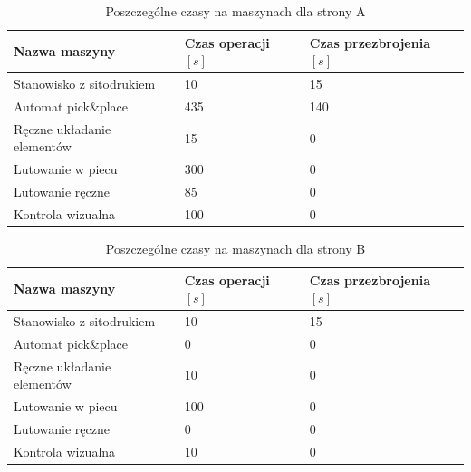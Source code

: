 \begin{table}[H]
	\centering
	\caption{Poszczególne czasy na maszynach dla strony A}
	\begin{tabular}{lll}
		\toprule
		Nazwa maszyny                 & Czas operacji $[s]$ & Czas przezbrojenia $[s]$ \\
		\midrule
		Stanowisko z sitodrukiem      & 10                  & 15                       \\
		Automat pick\&place           & 435                 & 140                      \\
		Ręczne układanie elementów & 15                  & 0                        \\
		Lutowanie w piecu             & 300                 & 0                        \\
		Lutowanie ręczne             & 85                  & 0                        \\
		Kontrola wizualna             & 100                 & 0                        \\
		\bottomrule
	\end{tabular}
\end{table}

\begin{table}[H]
	\centering
	\caption{Poszczególne czasy na maszynach dla strony B}
	\begin{tabular}{lll}
		\toprule
		Nazwa maszyny                 & Czas operacji $[s]$ & Czas przezbrojenia $[s]$ \\
		\midrule
		Stanowisko z sitodrukiem      & 10                  & 15                       \\
		Automat pick\&place           & 0                   & 0                        \\
		Ręczne układanie elementów & 10                  & 0                        \\
		Lutowanie w piecu             & 100                 & 0                        \\
		Lutowanie ręczne             & 0                   & 0                        \\
		Kontrola wizualna             & 10                  & 0                        \\
		\bottomrule
	\end{tabular}
\end{table}

